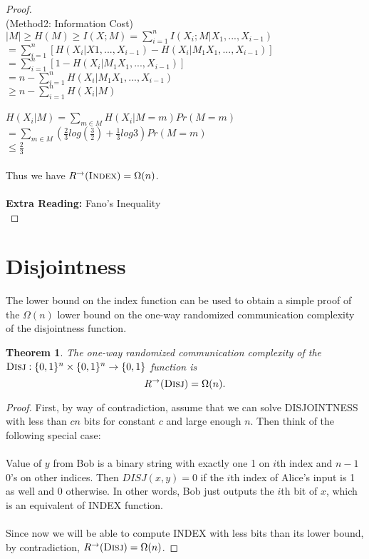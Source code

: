 \documentclass[11pt,oneside]{book}
\theoremstyle{plain}
\newtheorem{theorem}{Theorem}
\theoremstyle{definition}
\theoremstyle{plain}
\newcommand{\Disj}{\textsc{Disj}}
\newcommand{\Index}{\textsc{Index}}
\begin{document}
\begin{proof}
	 \\
	(Method2: Information Cost)\\
	$|M|\ge H(M) \ge I(X;M) = \sum^n_{i=1} I(X_i;M|X_1,...,X_{i-1})$\\
	$=\sum^n_{i=1} [H(X_i|X1,...,X_{i-1})-H(X_i|M_1X_1,...,X_{i-1})]$
	$=\sum^n_{i=1} [1-H(X_i|M_1X_1,...,X_{i-1})]$\\
	$=n-\sum^n_{i=1} H(X_i|M_1X_1,...,X_{i-1})$\\
	$\ge n-\sum_{i=1}^{n}H(X_i|M)$\\
	 \\
	$H(X_i|M)=\sum_{m\in M} H(X_i|M=m)Pr(M=m)$\\
	$= \sum_{m\in M} (\frac23log(\frac32)+\frac13 log3)Pr(M=m)$\\
	$\leq \frac23$\\
	 \\
	Thus we have $R^\rightarrow(\Index) = \Omega(n)$.\\
	 \\
	\textbf{Extra Reading:} Fano's Inequality \\
\end{proof}



 
\section{Disjointness}

The lower bound on the index function can be used to obtain a simple proof of the $\Omega(n)$ lower bound on the one-way randomized communication complexity of the disjointness function.

\begin{theorem}
	The one-way randomized communication complexity of the $\Disj : \{0,1\}^n \times \{0,1\}^n \to \{0,1\}$ function is
	\[
	R^\rightarrow(\Disj) = \Omega(n).
	\]
\end{theorem}

\begin{proof}
	First, by way of contradiction, assume that we can solve DISJOINTNESS with less than $cn$ bits for constant $c$ and large enough $n$. Then think of the following special case: \\
	\\
	Value of $y$ from Bob is a binary string with exactly one 1 on $i$th index and $n-1$ 0's on other indices. Then $DISJ(x,y) = 0$ if the $i$th index of Alice's input is 1 as well and 0 otherwise. In other words, Bob just outputs the $i$th bit of $x$, which is an equivalent of INDEX function. \\
	\\
	Since now we will be able to compute INDEX with less bits than its lower bound, by contradiction, $R^\rightarrow(\Disj) = \Omega(n)$.
\end{proof}
\end{document}
